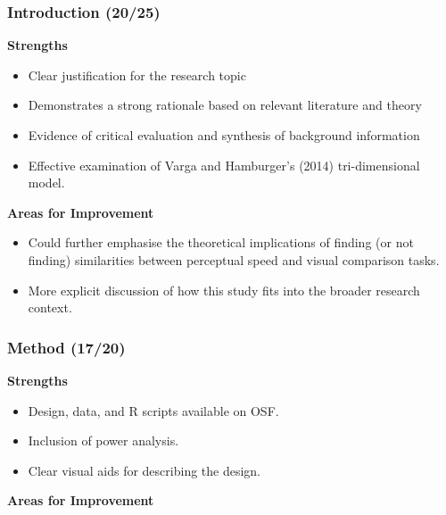 \documentclass[
  single column]{article}
\providecommand{\tightlist}{%
  \setlength{\itemsep}{0pt}\setlength{\parskip}{0pt}}\usepackage{longtable,booktabs,array}
\begin{document}
\subsubsection{Introduction (20/25)}\label{introduction-2025}

\textbf{Strengths}

\begin{itemize}
\tightlist
\item
  Clear justification for the research topic
\item
  Demonstrates a strong rationale based on relevant literature and
  theory
\item
  Evidence of critical evaluation and synthesis of background
  information
\item
  Effective examination of Varga and Hamburger's (2014) tri-dimensional
  model.
\end{itemize}

\textbf{Areas for Improvement}

\begin{itemize}
\tightlist
\item
  Could further emphasise the theoretical implications of finding (or
  not finding) similarities between perceptual speed and visual
  comparison tasks.
\item
  More explicit discussion of how this study fits into the broader
  research context.
\end{itemize}

\subsubsection{Method (17/20)}\label{method-1720}

\textbf{Strengths}

\begin{itemize}
\tightlist
\item
  Design, data, and R scripts available on OSF.
\item
  Inclusion of power analysis.
\item
  Clear visual aids for describing the design.
\end{itemize}

\textbf{Areas for Improvement}
\end{document}
